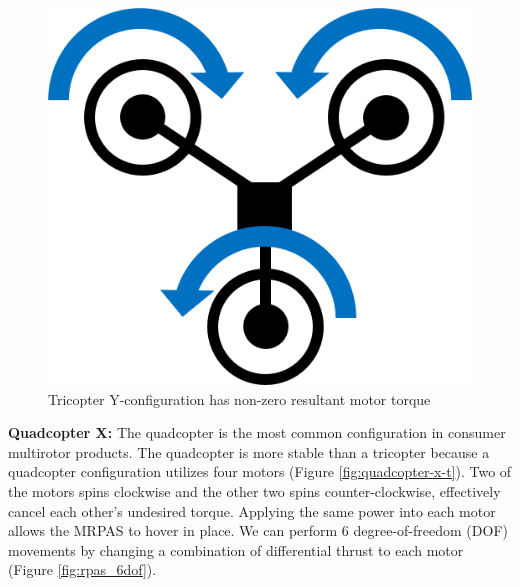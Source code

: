 \begin{figure}[H]
    \centering
    \includegraphics[scale=0.4]{img/drone_yconfigt}
    \caption{Tricopter Y-configuration has non-zero resultant motor torque}
    \label{fig:tricopter-y-t}
\end{figure}

\textbf{Quadcopter X: }
The quadcopter is the most common configuration in consumer multirotor products. The quadcopter is more stable than a tricopter because a quadcopter configuration utilizes four motors (Figure \ref{fig:quadcopter-x-t}). Two of the motors spins  
clockwise and the other two spins counter-clockwise, effectively cancel each other’s undesired torque. 
Applying the same power into each motor allows the MRPAS to hover in place. We can perform 6 degree-of-freedom (DOF) movements by changing a combination of differential thrust to each motor (Figure \ref{fig:rpas_6dof}).

